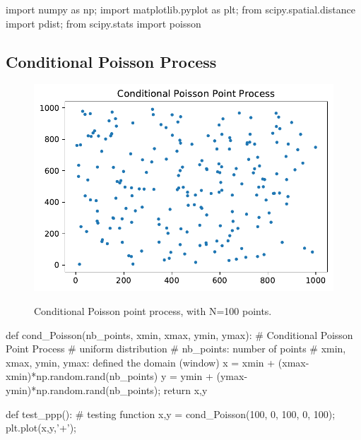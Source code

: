 \def\QRCODE{TB_IPR_TUT.IMG.point_processes_generation_pythonqrcode.png}
\def\QRPAGE{http://www.iptutorials.science/tree/master/TB_IPR/TUT.IMG.point_processes_generation/python}

\begin{python}
import numpy as np;
import matplotlib.pyplot as plt;
from scipy.spatial.distance import pdist;
from scipy.stats import poisson
\end{python}

\vspace*{-8pt}

\subsection{Conditional Poisson Process}

\vspace*{-8pt}

\begin{figure}[htbp]
\centering\caption{Conditional Poisson point process, with N=100 points.}%
 \includegraphics[width=.5\textwidth]{ppp.pdf}%
 \label{fig:point_process_generation:python:ppp}%
\end{figure}

\vspace*{-8pt}

\begin{python}
def cond_Poisson(nb_points, xmin, xmax, ymin, ymax):
    # Conditional Poisson Point Process
    # uniform distribution
    # nb_points: number of points
    # xmin, xmax, ymin, ymax: defined the domain (window)
    x = xmin + (xmax-xmin)*np.random.rand(nb_points)
    y = ymin + (ymax-ymin)*np.random.rand(nb_points);
    return x,y

def test_ppp():
    # testing function
    x,y = cond_Poisson(100, 0, 100, 0, 100);
    plt.plot(x,y,'+');
\end{python}

